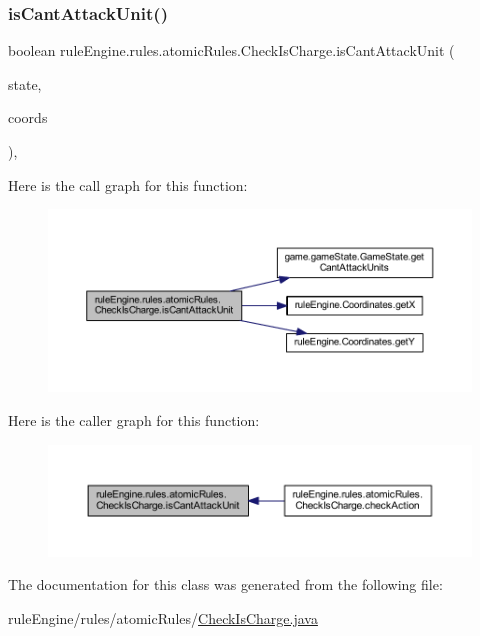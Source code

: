 \subsubsection{\texorpdfstring{is\+Cant\+Attack\+Unit()}{isCantAttackUnit()}}
{\footnotesize\ttfamily boolean rule\+Engine.\+rules.\+atomic\+Rules.\+Check\+Is\+Charge.\+is\+Cant\+Attack\+Unit (\begin{DoxyParamCaption}\item[{\mbox{\hyperlink{classgame_1_1game_state_1_1_game_state}{Game\+State}}}]{state,  }\item[{\mbox{\hyperlink{classrule_engine_1_1_coordinates}{Coordinates}}}]{coords }\end{DoxyParamCaption})\hspace{0.3cm}{\ttfamily [inline]}, {\ttfamily [private]}}

Here is the call graph for this function\+:
\nopagebreak
\begin{figure}[H]
\begin{center}
\leavevmode
\includegraphics[width=350pt]{classrule_engine_1_1rules_1_1atomic_rules_1_1_check_is_charge_a268e5c048a137a32a882802bf494a7c6_cgraph}
\end{center}
\end{figure}
Here is the caller graph for this function\+:
\nopagebreak
\begin{figure}[H]
\begin{center}
\leavevmode
\includegraphics[width=350pt]{classrule_engine_1_1rules_1_1atomic_rules_1_1_check_is_charge_a268e5c048a137a32a882802bf494a7c6_icgraph}
\end{center}
\end{figure}


The documentation for this class was generated from the following file\+:\begin{DoxyCompactItemize}
\item 
rule\+Engine/rules/atomic\+Rules/\mbox{\hyperlink{_check_is_charge_8java}{Check\+Is\+Charge.\+java}}\end{DoxyCompactItemize}
